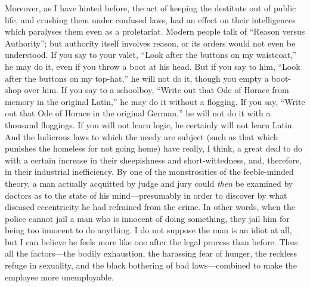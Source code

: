 \documentclass{book}
\begin{document}
Moreover, as I have hinted before, the act of keeping the destitute out of public life, and crushing them under confused laws, had an effect on their intelligences which paralyses them even as a proletariat. Modern people talk of “Reason versus Authority”; but authority itself involves reason, or its orders would not even be understood. If you say to your valet, “Look after the buttons on my waistcoat,” he may do it, even if you throw a boot at his head. But if you say to him, “Look after the buttons on my top-hat,” he will not do it, though you empty a boot-shop over him. If you say to a schoolboy, “Write out that Ode of Horace from memory in the original Latin,” he may do it without a flogging. If you say, “Write out that Ode of Horace in the original German,” he will not do it with a thousand floggings. If you will not learn logic, he certainly will not learn Latin. And the ludicrous laws to which the needy are subject (such as that which punishes the homeless for not going home) have really, I think, a great deal to do with a certain increase in their sheepishness and short-wittedness, and, therefore, in their industrial inefficiency. By one of the monstrosities of the feeble-minded theory, a man actually acquitted by judge and jury could \emph{then} be examined by doctors as to the state of his mind—presumably in order to discover by what diseased eccentricity he had refrained from the crime. In other words, when the police cannot jail a man who is innocent of doing something, they jail him for being too innocent to do anything. I do not suppose the man is an idiot at all, but I can believe he feels more like one after the legal process than before. Thus all the factors—the bodily exhaustion, the harassing fear of hunger, the reckless refuge in sexuality, and the black bothering of bad laws—combined to make the employee more unemployable.
\end{document}
